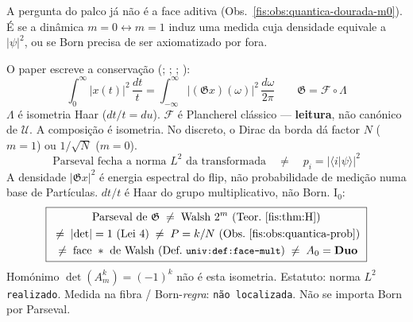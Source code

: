 \documentclass[livro.tex]{subfiles}
\begin{document}
\begin{observacao}\label{fis:obs:quantica-parseval}
A pergunta do palco já não é a face aditiva
(Obs.~\ref{fis:obs:quantica-dourada-m0}).
É se a dinâmica \(m=0\leftrightarrow m=1\)
induz uma medida cuja densidade equivale a
\(\lvert\psi\rvert^{2}\), ou se Born precisa
de ser axiomatizado por fora.

O paper escreve a conservação
(;
;
;
):
\[
\boxed{\;
\int_{0}^{\infty}\lvert x(t)\rvert^{2}\,
\frac{dt}{t}
=
\int_{-\infty}^{\infty}
\lvert(\mathfrak{G}x)(\omega)\rvert^{2}\,
\frac{d\omega}{2\pi}
\qquad
\mathfrak{G}=\mathcal{F}\circ\Lambda
\;}
\]
\(\Lambda\) é isometria Haar
(\(dt/t=du\)). \(\mathcal{F}\) é
Plancherel clássico --- \textbf{leitura},
não canónico de \(\mathcal{U}\).
A composição é isometria. No discreto,
o Dirac da borda dá factor \(N\)
(\(m=1\)) ou \(1/\sqrt{N}\) (\(m=0\)).
\[
\boxed{\;
\text{Parseval fecha a norma }L^{2}
\text{ da transformada}
\quad\neq\quad
p_{i}=\lvert\langle i\rvert\psi\rangle\rvert^{2}
\;}
\]
A densidade \(\lvert\mathfrak{G}x\rvert^{2}\)
é energia espectral do flip, não
probabilidade de medição numa base de
Partículas. \(dt/t\) é Haar do grupo
multiplicativo, não Born.
\(\mathrm{I}_{0}\):
\[
\boxed{\;
\begin{gathered}
\text{Parseval de }\mathfrak{G}
\;\neq\;
\text{Walsh }2^{m}
\text{ (Teor.~\ref{fis:thm:H})}
\\
\;\neq\;
\lvert\det\rvert=1
\text{ (Lei~4)}
\;\neq\;
P=k/N
\text{ (Obs.~\ref{fis:obs:quantica-prob})}
\\
\;\neq\;
\text{face }*\text{ de Walsh}
\text{ (Def.~\texttt{\small univ:def:face-mult})}
\;\neq\;
A_{0}=\mathbf{Duo}
\end{gathered}
\;}
\]
Homónimo \(\det(A_{m}^{k})=(-1)^{k}\)
não é esta isometria.
Estatuto: norma \(L^{2}\)
\texttt{realizado}.
Medida na fibra / Born-\emph{regra}:
\texttt{não localizada}.
Não se importa Born por Parseval.
\end{observacao}
\end{document}
